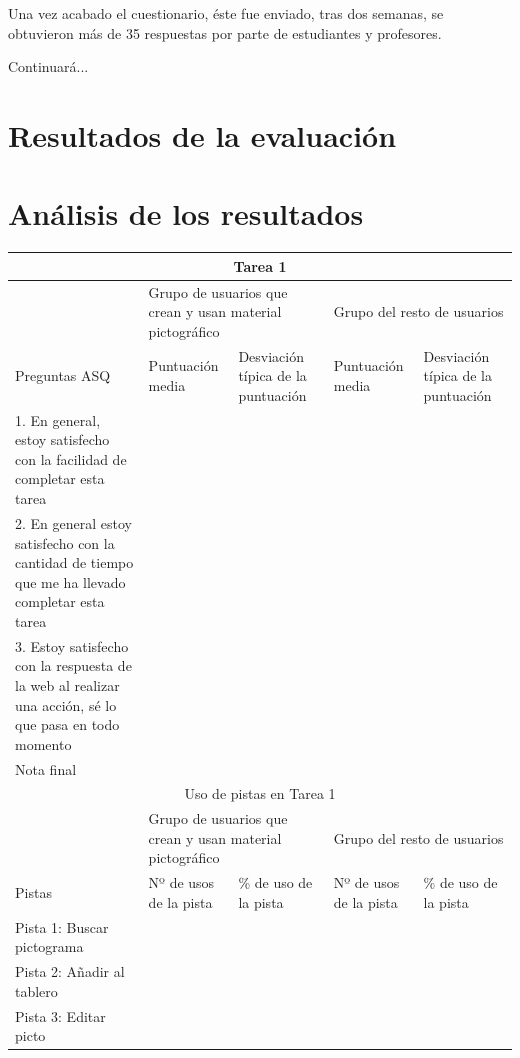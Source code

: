 Una vez acabado el cuestionario, éste fue enviado, tras dos semanas, se obtuvieron más de 35 respuestas por parte de estudiantes y profesores. 

Continuará...

\section{Resultados de la evaluación}
\label{eva:res}

\section{Análisis de los resultados}
\label{eva:analisis}


\begin{tabular}{ |p{4cm}|p{2cm}|p{2cm}|p{2cm}|p{2cm}|  }
	\hline
	\multicolumn{5}{|c|}{Tarea 1} \\
	\hline
	 & \multicolumn{2}{|p{4cm}|}{Grupo de usuarios que crean y usan material pictográfico} & \multicolumn{2}{|p{4cm}|}{Grupo del resto de usuarios }  \\ 
	\hline
	 Preguntas ASQ & Puntuación media  &Desviación típica de la puntuación & Puntuación media & Desviación típica de la puntuación\\
	\hline
	1. En general, estoy satisfecho con la facilidad de completar esta tarea &  & &  &\\
	\hline
	2. En general estoy satisfecho con la cantidad de tiempo que me ha llevado completar esta tarea&  &  & &\\
	\hline
	3. Estoy satisfecho con la respuesta de la web al realizar una acción, sé lo que pasa en todo momento & & &   &\\
	\hline
	Nota final & & &  &\\
	\hline
	\multicolumn{5}{|c|}{Uso de pistas en Tarea 1} \\
	\hline
	& \multicolumn{2}{|p{4cm}|}{Grupo de usuarios que crean y usan material pictográfico} & \multicolumn{2}{|p{4cm}|}{Grupo del resto de usuarios }  \\ 
	\hline
	 Pistas &Nº de usos de la pista &\% de uso de la pista&Nº de usos de la pista&\% de uso de la pista\\
	\hline
	Pista 1: Buscar pictograma &  & &  &\\
	\hline
	Pista 2: Añadir al tablero &  &  & &\\
	\hline
	Pista 3: Editar picto & & &   &\\
	\hline
\end{tabular}
